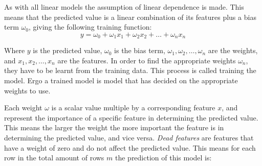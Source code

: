 \documentclass[12pt letter]{report}
\begin{document}
As with all linear models the assumption of linear dependence is made. This means that the predicted value is a linear
combination of its features plus a bias term $\omega_0$, giving the following training function:
\[
  y = \omega_0 + \omega_1 x_1 + \omega_2 x_2 + \ldots + \omega_n x_n
\]

Where $y$ is the predicted value, $\omega_0$ is the bias term, $\omega_1, \omega_2, \ldots, \omega_n$ are the weights,
and $x_1, x_2, \ldots, x_n$ are the features. In order to find the appropriate weights $\omega_n$, they have to be
learnt from the training data.  This process is called training the model. Ergo a trained model is model that has
decided on the appropriate weights to use.

Each weight $\omega$ is a scalar value multiple by a corresponding feature $x$, and represent the importance of a
specific feature in determining the predicted value. This means the larger the weight the more important the feature is
in determining the predicted value, and vice versa. \textit{Dead features} are features that have a weight of zero and do not
affect the predicted value. This means for each row in the total amount of rows $m$ the prediction of this model is:
\end{document}
